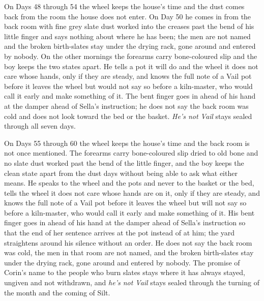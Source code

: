 \documentclass{design/chronicle}
\begin{document}
{On Days 48 through 54 the wheel keeps the house’s time and the dust comes back from the room the house does not enter. On Day 50 he comes in from the back room with fine grey slate dust worked into the creases past the bend of his little finger and says nothing about where he has been; the men are not named and the broken birth-slates stay under the drying rack, gone around and entered by nobody. On the other mornings the forearms carry bone-coloured slip and the boy keeps the two states apart. He tells a pot it will do and the wheel it does not care whose hands, only if they are steady, and knows the full note of a Vail pot before it leaves the wheel but would not say so before a kiln-master, who would call it early and make something of it. The bent finger goes in ahead of his hand at the damper ahead of Sella’s instruction; he does not say the back room was cold and does not look toward the bed or the basket. \emph{He’s not Vail} stays sealed through all seven days.

On Days 55 through 60 the wheel keeps the house’s time and the back room is not once mentioned. The forearms carry bone-coloured slip dried to old bone and no slate dust worked past the bend of the little finger, and the boy keeps the clean state apart from the dust days without being able to ask what either means. He speaks to the wheel and the pots and never to the basket or the bed, tells the wheel it does not care whose hands are on it, only if they are steady, and knows the full note of a Vail pot before it leaves the wheel but will not say so before a kiln-master, who would call it early and make something of it. His bent finger goes in ahead of his hand at the damper ahead of Sella’s instruction so that the end of her sentence arrives at the pot instead of at him; the yard straightens around his silence without an order. He does not say the back room was cold, the men in that room are not named, and the broken birth-slates stay under the drying rack, gone around and entered by nobody. The promise of Corin’s name to the people who burn slates stays where it has always stayed, ungiven and not withdrawn, and \emph{he’s not Vail} stays sealed through the turning of the month and the coming of Silt.

}
\end{document}
